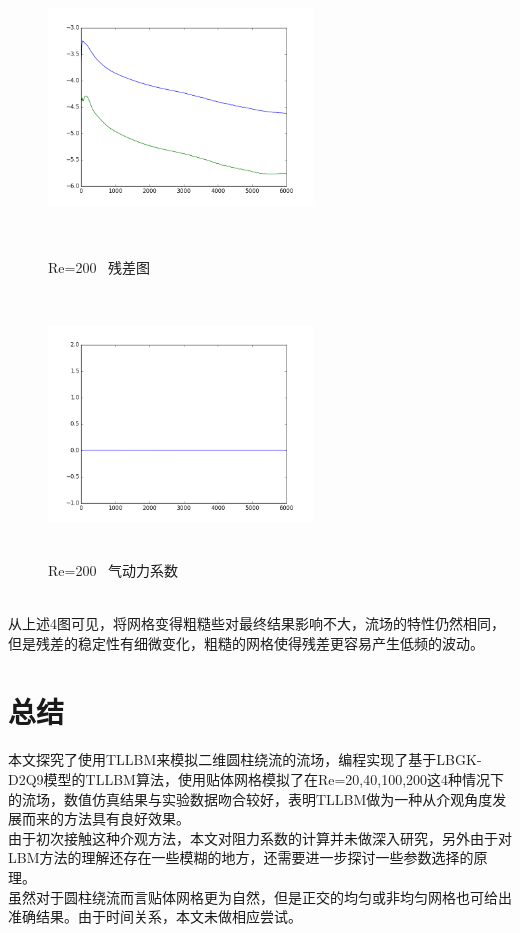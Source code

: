 \documentclass[UTF8]{ctexart}
\begin{document}
\begin{figure}[htbp]
\begin{minipage}{7cm}
\includegraphics[height=7cm,width=7cm]{../pic/Residue_Contrast.png}
\caption{Re=200 \ 残差图}
\end{minipage}
\begin{minipage}{7cm}
\includegraphics[height=7cm,width=7cm]{../pic/Aerodynamics_Contrast.png}
\caption{Re=200 \ 气动力系数}
\end{minipage}
\end{figure}\\
\indent 从上述4图可见，将网格变得粗糙些对最终结果影响不大，流场的特性仍然相同，但是残差的稳定性有细微变化，粗糙的网格使得残差更容易产生低频的波动。
\clearpage

\section{总结}
本文探究了使用TLLBM来模拟二维圆柱绕流的流场，编程实现了基于LBGK-D2Q9模型的TLLBM算法，使用贴体网格模拟了在Re=20,40,100,200这4种情况下的流场，数值仿真结果与实验数据吻合较好，表明TLLBM做为一种从介观角度发展而来的方法具有良好效果。\\
\indent 由于初次接触这种介观方法，本文对阻力系数的计算并未做深入研究，另外由于对LBM方法的理解还存在一些模糊的地方，还需要进一步探讨一些参数选择的原理。\\
\indent 虽然对于圆柱绕流而言贴体网格更为自然，但是正交的均匀或非均匀网格也可给出准确结果。由于时间关系，本文未做相应尝试。
\end{document}
